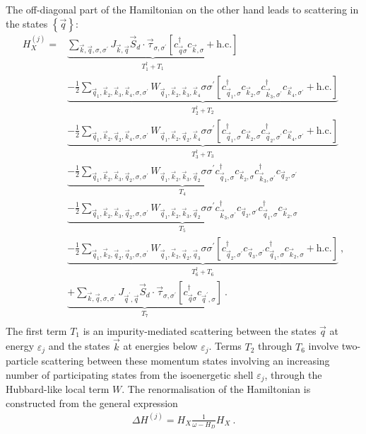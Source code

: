 \documentclass{revtex4-2}
\begin{document}
The off-diagonal part of the Hamiltonian on the other hand leads to scattering in the states \(\left\{ \vec q \right\} \):
\begin{equation}\begin{aligned}
	H_X^{(j)} =& \underbrace{\sum_{\vec k, \vec q, \sigma,\sigma^\prime}J_{\vec k, \vec q} \vec{S}_d\cdot\vec{\tau}_{\sigma,\sigma^\prime}\left[c^\dagger_{\vec q\sigma}c_{\vec k,\sigma} + \text{h.c.}\right]}_{T_1^\dagger + T_1} \\
		   &\underbrace{- \frac{1}{2}\sum_{\vec q_1,\vec k_2, \vec k_3, \vec k_4,\sigma,\sigma^\prime}W_{\vec q_1,\vec k_2,\vec k_3,\vec k_4} \sigma\sigma^\prime \left[c^\dagger_{\vec q_1,\sigma}c_{\vec k_2,\sigma}c^\dagger_{\vec k_3,\sigma^\prime}c_{\vec k_4,\sigma^\prime} + \text{h.c.}\right]}_{T_2^\dagger + T_2}\\
		   &\underbrace{- \frac{1}{2}\sum_{\vec q_1,\vec k_2, \vec q_2, \vec k_4,\sigma,\sigma^\prime}W_{\vec q_1,\vec k_2, \vec q_2, \vec k_4} \sigma\sigma^\prime \left[c^\dagger_{\vec q_1,\sigma}c_{\vec k_2,\sigma}c^\dagger_{\vec q_2,\sigma^\prime}c_{\vec k_4,\sigma^\prime} + \text{h.c.}\right]}_{T_3^\dagger + T_3}\\
		   &\underbrace{- \frac{1}{2}\sum_{\vec q_1,\vec k_2,\vec k_3,\vec q_2,\sigma,\sigma^\prime}W_{\vec q_1,\vec k_2,\vec k_3,\vec q_2} \sigma\sigma^\prime c^\dagger_{\vec q_1,\sigma}c_{\vec k_2,\sigma}c^\dagger_{\vec k_3,\sigma^\prime}c_{\vec q_2,\sigma^\prime}}_{T_4}\\
		   &\underbrace{- \frac{1}{2}\sum_{\vec q_1,\vec k_2,\vec k_3,\vec q_2,\sigma,\sigma^\prime}W_{\vec q_1,\vec k_2,\vec k_3,\vec q_2} \sigma\sigma^\prime c^\dagger_{\vec k_3,\sigma^\prime}c_{\vec q_2,\sigma^\prime}c^\dagger_{\vec q_1,\sigma}c_{\vec k_2,\sigma}}_{T_5}\\
		   &\underbrace{- \frac{1}{2}\sum_{\vec q_1,\vec k_2, \vec q_2, \vec q_3,\sigma,\sigma^\prime}W_{\vec q_1,\vec k_2, \vec q_2, \vec q_3} \sigma\sigma^\prime \left[c^\dagger_{\vec q_2,\sigma^\prime}c_{\vec q_3,\sigma^\prime}c^\dagger_{\vec q_1,\sigma}c_{\vec k_2,\sigma} + \text{h.c.}\right]}_{T_6^\dagger + T_6}~,\\
		   & \underbrace{+\sum_{\vec k, \vec q, \sigma,\sigma^\prime}J_{\vec q^\prime, \vec q} \vec{S}_d\cdot\vec{\tau}_{\sigma,\sigma^\prime}\left[c^\dagger_{\vec q\sigma}c_{\vec q^\prime,\sigma}\right]}_{T_7}~.\\
\end{aligned}\end{equation}
The first term \(T_1\) is an impurity-mediated scattering between the states \(\vec q\) at energy \(\varepsilon_j\) and the states \(\vec k\) at energies below \(\varepsilon_j\). Terms \(T_2\) through \(T_6\) involve two-particle scattering between these momentum states involving an increasing number of participating states from the isoenergetic shell \(\varepsilon_j\), through the Hubbard-like local term \(W\). The renormalisation of the Hamiltonian is constructed from the general expression
\begin{equation}\begin{aligned}
	\Delta H^{(j)} = H_X \frac{1}{\omega- H_D} H_X~.
\end{aligned}\end{equation}
\end{document}
